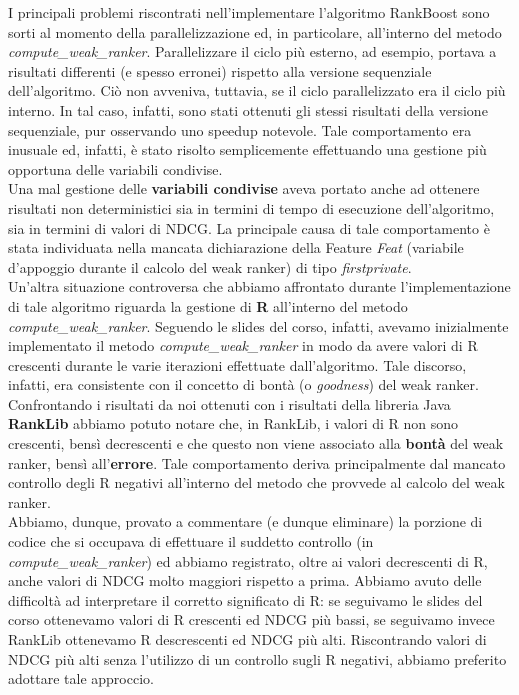 I principali problemi riscontrati nell'implementare l'algoritmo RankBoost sono sorti al momento della parallelizzazione ed, in particolare, all'interno del metodo \textit{compute\_weak\_ranker}. Parallelizzare il ciclo più esterno, ad esempio, portava a risultati differenti (e spesso erronei) rispetto alla versione sequenziale dell'algoritmo. Ciò non avveniva, tuttavia, se il ciclo parallelizzato era il ciclo più interno. In tal caso, infatti, sono stati ottenuti gli stessi risultati della versione sequenziale, pur osservando uno speedup notevole. Tale comportamento era inusuale ed, infatti, è stato risolto semplicemente effettuando una gestione più opportuna delle variabili condivise.\\
Una mal gestione delle \textbf{variabili condivise} aveva portato anche ad ottenere risultati non deterministici sia in termini di tempo di esecuzione dell'algoritmo, sia in termini di valori di NDCG. La principale causa di tale comportamento è stata individuata nella mancata dichiarazione della Feature \textit{Feat} (variabile d'appoggio durante il calcolo del weak ranker) di tipo \textit{firstprivate}.\\
Un'altra situazione controversa che abbiamo affrontato durante l'implementazione di tale algoritmo riguarda la gestione di \textbf{R} all'interno del metodo \textit{compute\_weak\_ranker}. Seguendo le slides del corso, infatti, avevamo inizialmente implementato il metodo \textit{compute\_weak\_ranker} in modo da avere valori di R crescenti durante le varie iterazioni effettuate dall'algoritmo. Tale discorso, infatti, era consistente con il concetto di bontà (o \textit{goodness}) del weak ranker.\\
Confrontando i risultati da noi ottenuti con i risultati della libreria Java \textbf{RankLib} abbiamo potuto notare che, in RankLib, i valori di R non sono crescenti, bensì decrescenti e che questo non viene associato alla \textbf{bontà} del weak ranker, bensì all'\textbf{errore}. Tale comportamento deriva principalmente dal mancato controllo degli R negativi all'interno del metodo che provvede al calcolo del weak ranker.\\
Abbiamo, dunque, provato a commentare (e dunque eliminare) la porzione di codice che si occupava di effettuare il suddetto controllo (in \textit{compute\_weak\_ranker}) ed abbiamo registrato, oltre ai valori decrescenti di R, anche valori di NDCG molto maggiori rispetto a prima. Abbiamo avuto delle difficoltà ad interpretare il corretto significato di R: se seguivamo le slides del corso ottenevamo valori di R crescenti ed NDCG più bassi, se seguivamo invece RankLib ottenevamo R descrescenti ed NDCG più alti. Riscontrando valori di NDCG più alti senza l'utilizzo di un controllo sugli R negativi, abbiamo preferito adottare tale approccio.\\
